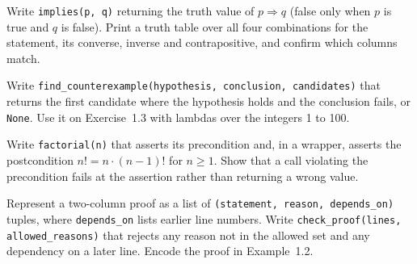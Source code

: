 \begin{codeexercises}
\item Write \lstinline!implies(p, q)! returning the truth value of $p \Rightarrow q$ (false only when $p$ is true and $q$ is false). Print a truth table over all four combinations for the statement, its converse, inverse and contrapositive, and confirm which columns match.
\item Write \lstinline!find_counterexample(hypothesis, conclusion, candidates)! that returns the first candidate where the hypothesis holds and the conclusion fails, or \lstinline!None!. Use it on Exercise~1.3 with lambdas over the integers 1 to 100.
\item Write \lstinline!factorial(n)! that asserts its precondition and, in a wrapper, asserts the postcondition $n! = n \cdot (n-1)!$ for $n \ge 1$. Show that a call violating the precondition fails at the assertion rather than returning a wrong value.
\item Represent a two-column proof as a list of \lstinline!(statement, reason, depends_on)! tuples, where \lstinline!depends_on! lists earlier line numbers. Write \lstinline!check_proof(lines, allowed_reasons)! that rejects any reason not in the allowed set and any dependency on a later line. Encode the proof in Example~1.2.
\end{codeexercises}
